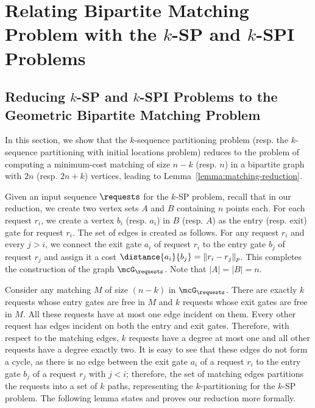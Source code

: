 \newpage
\appendix
\section{Relating Bipartite Matching Problem with the \texorpdfstring{$k$}{-}-SP and \texorpdfstring{$k$}{-}-SPI Problems}

\subsection{Reducing \texorpdfstring{$k$}{}-SP and \texorpdfstring{$k$}{}-SPI Problems to the Geometric Bipartite Matching Problem}\label{sec:background}
In this section, we show that the $k$-sequence partitioning problem (resp. the $k$-sequence partitioning with initial locations problem) reduces to the problem of computing a minimum-cost matching of size $n-k$ (resp. $n$) in a bipartite graph with $2n$ (resp. $2n+k$) vertices, leading to Lemma~\ref{lemma:matching-reduction}. 

%

 Given an input sequence $\requests$ for the $k$-SP problem, recall that in our reduction, we create two vertex sets $A$ and $B$ containing $n$ points each. For each request $r_i$, we create a vertex $b_i$ (resp. $a_i$) in $B$ (resp. $A$) as the entry (resp. exit) gate for request $r_i$. The set of edges is created as follows. For any request $r_i$ and every $j > i$, we connect the exit gate $a_i$ of request $r_i$ to the entry gate $b_j$ of request $r_j$ and assign it a cost $\distance{a_i}{b_j}=\|r_i-r_j\|_p$. 
This completes the construction of the graph $\mcG_\requests$. Note that $|A|=|B|=n$.



Consider any matching $M$ of size $(n-k)$ in $\mcG_\requests$. There are exactly $k$ requests whose entry gates are free in $M$ and $k$ requests whose exit gates are free in $M$. All these requests have at most one edge incident on them. Every other request has edges incident on both the entry and exit gates. Therefore, with respect to the matching edges, $k$ requests have a degree at most one and all other requests have a degree exactly two. It is easy to see that these edges do not form a cycle, as there is no edge between the exit gate $a_i$ of a request $r_i$ to the entry gate $b_j$ of a request $r_j$ with $j<i$; therefore, the set of matching edges partitions the requests into a set of $k$ paths, representing the $k$-partitioning for the $k$-SP problem. The following lemma states and proves our reduction more formally. 

